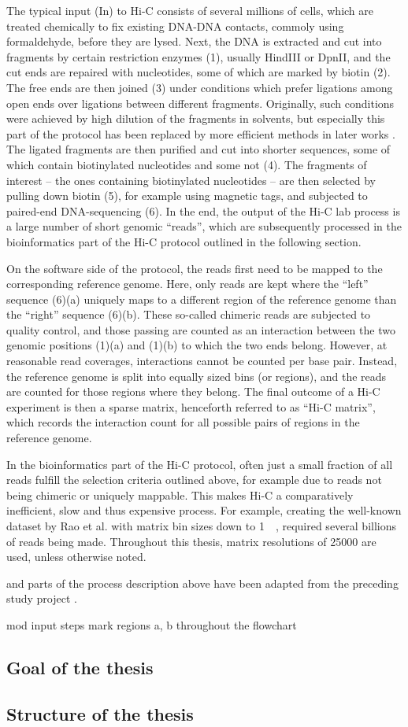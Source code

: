 The typical input (In) to Hi-C consists of several millions of cells,
which are treated chemically to fix existing DNA-DNA contacts, 
commoly using formaldehyde, before they are lysed.
Next, the DNA is extracted and cut into fragments by certain restriction enzymes (1),
usually HindIII or DpnII, 
and the cut ends are repaired with nucleotides, some of which are marked by biotin (2).
The free ends are then joined (3) under conditions which prefer
ligations among open ends over ligations between different fragments.
Originally, such conditions were achieved by high dilution of the fragments in
solvents, but especially this part of the protocol has been replaced by 
more efficient methods in later works \cite{Rao2014,Belaghzal2017}.
The ligated fragments are then purified and cut into shorter sequences,
some of which contain biotinylated nucleotides and some not (4).
The fragments of interest -- the ones containing biotinylated nucleotides -- 
are then selected by pulling down biotin (5), for example using magnetic tags,  
and subjected to paired-end DNA-sequencing (6).
In the end, the output of the Hi-C lab process is a large number of short genomic ``reads'',
which are subsequently processed in the bioinformatics part of the Hi-C protocol 
outlined in the following section.

On the software side of the protocol, the reads first need to be mapped 
to the corresponding reference genome.
Here, only reads are kept where the ``left'' sequence (6)(a)
uniquely maps to a different region of the reference genome than the ``right'' sequence (6)(b).
These so-called chimeric reads are subjected to quality control, and those passing are counted as an interaction
between the two genomic positions (1)(a) and (1)(b) to which the two ends belong.
However, at reasonable read coverages, interactions cannot be counted per base pair. 
Instead, the reference genome is split into equally sized bins (or regions), 
and the reads are counted for those regions where they belong. 
The final outcome of a Hi-C experiment is then a sparse matrix, henceforth referred to as ``Hi-C matrix'', 
which records the interaction count for all possible pairs of regions in the reference genome.

In the bioinformatics part of the Hi-C protocol, often just a small fraction of all reads 
fulfill the selection criteria outlined above, for example due to reads not being chimeric or uniquely mappable.
This makes Hi-C a comparatively inefficient, slow and thus expensive process.
For example, creating the well-known dataset by Rao et al. \cite{Rao2014} with matrix bin sizes down to \SI{1}{\kilo\bp}, required several billions of reads being made. 
Throughout this thesis, matrix resolutions of \SI{25000}{\bp} are used, unless otherwise noted.

 and parts of the process description above 
have been adapted from the preceding study project \cite{Krauth2020}.

\xxx mod input steps
\xxx mark regions a, b throughout the flowchart

\subsection{Goal of the thesis}
\subsection{Structure of the thesis}
